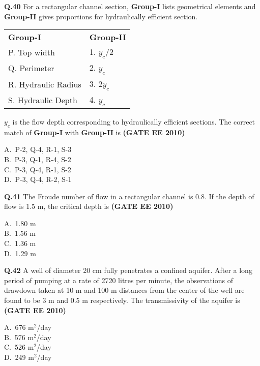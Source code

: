 \documentclass[journal,12pt,onecolumn]{exam}
\theoremstyle{remark}
\begin{document}
\noindent\textbf{Q.40} For a rectangular channel section, \textbf{Group-I} lists geometrical elements and \textbf{Group-II} gives proportions for hydraulically efficient section. \\[0.2cm]
\begin{center}
    
\begin{tabular}{l l}
\textbf{Group-I}  & \textbf{Group-II}  \\
P. Top width     & 1. $y_c/2$ \\
Q. Perimeter    & 2.  $y_c$     \\
R. Hydraulic Radius    & 3.  $2y_c$          \\
S. Hydraulic Depth    & 4. $y_c$
\end{tabular}
\end{center}
$y_c$ is the flow depth corresponding to hydraulically efficient sections. The correct match of \textbf{Group-I} with \textbf{Group-II} is
\hfill\textbf{(GATE EE 2010)}
\begin{multicols}{4}
A.\ P-2, Q-4, R-1, S-3 \\
B.\ P-3, Q-1, R-4, S-2 \\
C.\ P-3, Q-4, R-1, S-2 \\
D.\ P-3, Q-4, R-2, S-1
\end{multicols}

\noindent\textbf{Q.41} The Froude number of flow in a rectangular channel is 0.8. If the depth of flow is 1.5 m, the critical depth is
\hfill\textbf{(GATE EE 2010)}
\begin{multicols}{4}
A.\ 1.80 m \\
B.\ 1.56 m \\
C.\ 1.36 m \\
D.\ 1.29 m
\end{multicols}

\noindent\textbf{Q.42} A well of diameter 20 cm fully penetrates a confined aquifer. After a long period of pumping at a rate of 2720 litres per minute, the observations of drawdown taken at 10 m and 100 m distances from the center of the well are found to be 3 m and 0.5 m respectively. The transmissivity of the aquifer is
\hfill\textbf{(GATE EE 2010)}
\begin{multicols}{4}
A.\ 676 m$^2$/day \\
B.\ 576 m$^2$/day \\
C.\ 526 m$^2$/day \\
D.\ 249 m$^2$/day
\end{multicols}
\end{document}
